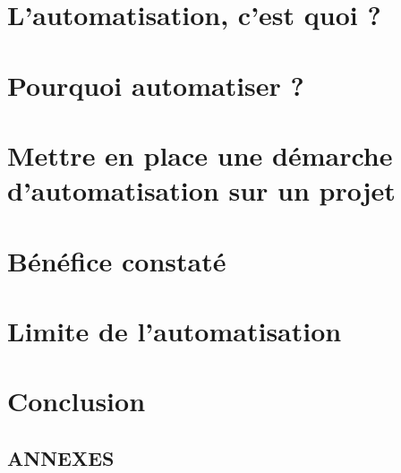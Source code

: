 \documentclass[11pt,a4paper]{article}
\begin{document}
  \section{L'automatisation, c'est quoi ?}
	
\newpage
	\section{Pourquoi automatiser ?}
	
\newpage
	\section{Mettre en place une démarche d'automatisation sur un projet}
	
\newpage
	\section{Bénéfice constaté}
	
\newpage
	\section{Limite de l'automatisation}
	
\newpage
	\pagestyle{plain} %
	\section*{Conclusion}
	
\newpage
	\glsaddall %
  \printglossaries %
\newpage
	\nocite{*} %
	 
	{}
	\clearpage

	\listoffigures 
	\listoflistings
	\listoftables
\newpage
		\begin{center}
			\begin{Huge}
				\section*{\MakeUppercase{Annexes}} 
			\end{Huge}
		\end{center}
\newpage
	\appendix %
	
\end{document}
